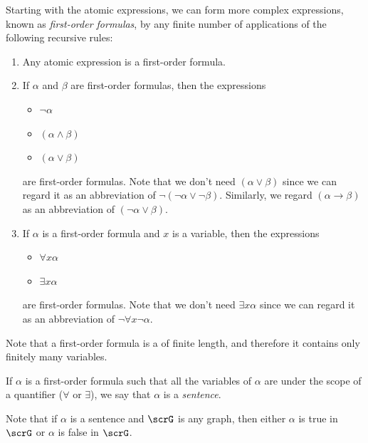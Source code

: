 \begin{definition}
  Starting with the atomic expressions, we can form more complex expressions, known as \emph{first-order formulas}, by any finite number of applications of the following recursive rules:

  \begin{enumerate}
  \item
    Any atomic expression is a first-order formula.
  \item
    If $\alpha$ and $\beta$ are first-order formulas, then the expressions
    \begin{itemize}
    \item
      $\neg\alpha$
    \item
      $(\alpha\land \beta)$
    \item
      $(\alpha\lor \beta)$
    \end{itemize}
    are first-order formulas.
    Note that we don’t need $(\alpha\lor \beta)$ since we can regard it as an abbreviation of $\neg(\neg\alpha\lor \neg\beta)$.
    Similarly, we regard $(\alpha\to \beta)$ as an abbreviation of $(\neg\alpha\lor \beta)$.
  \item
    If $\alpha$ is a first-order formula and $x$ is a variable, then the expressions
    \begin{itemize}
    \item
      $\forall x \alpha$
    \item
      $\exists x \alpha$
    \end{itemize}
    are first-order formulas.
    Note that we don’t need $\exists x \alpha$ since we can regard it as an abbreviation of $\neg\forall x \neg\alpha$.
  \end{enumerate}
\end{definition}

Note that a first-order formula is a  of finite length, and therefore it contains only finitely many variables.

\begin{definition}
  \label{def:sentence}
  If $\alpha$ is a first-order formula such that all the variables of $\alpha$ are under the scope of a quantifier ($\forall$ or $\exists$), we say that $\alpha$ is a \emph{sentence}.
\end{definition}

\begin{remark}
  \label{rem:sentence}
  Note that if $\alpha$ is a sentence and $\scrG$ is any graph, then either $\alpha$ is true in $\scrG$ or $\alpha$ is false in $\scrG$.
\end{remark}

